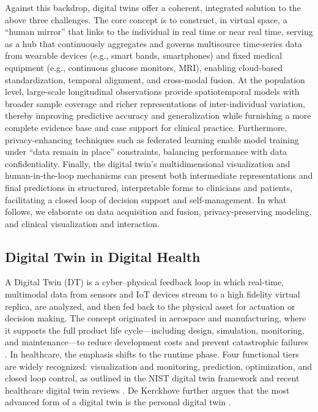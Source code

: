 \documentclass[acmsmall]{acmart}
\begin{document}
Against this backdrop, digital twins offer a coherent, integrated solution to the above three challenges. The core concept is to construct, in virtual space, a “human mirror” that links to the individual in real time or near real time, serving as a hub that continuously aggregates and governs multisource time-series data from wearable devices (e.g., smart bands, smartphones) and fixed medical equipment (e.g., continuous glucose monitors, MRI), enabling cloud-based standardization, temporal alignment, and cross-modal fusion. At the population level, large-scale longitudinal observations provide spatiotemporal models with broader sample coverage and richer representations of inter-individual variation, thereby improving predictive accuracy and generalization while furnishing a more complete evidence base and case support for clinical practice. Furthermore, privacy-enhancing techniques such as federated learning enable model training under “data remain in place” constraints, balancing performance with data confidentiality. Finally, the digital twin’s multidimensional visualization and human-in-the-loop mechanisms can present both intermediate representations and final predictions in structured, interpretable forms to clinicians and patients, facilitating a closed loop of decision support and self-management. In what follows, we elaborate on data acquisition and fusion, privacy-preserving modeling, and clinical visualization and interaction.

\subsection{Digital Twin in Digital Health}

A Digital Twin (DT) is a cyber–physical feedback loop in which real-time, multimodal data from sensors and IoT devices stream to a high fidelity virtual replica, are analyzed, and then fed back to the physical asset for actuation or decision making. The concept originated in aerospace and manufacturing, where it supports the full product life cycle—including design, simulation, monitoring, and maintenance—to reduce development costs and prevent catastrophic failures \cite{Tao2018}. In healthcare, the emphasis shifts to the runtime phase. Four functional tiers are widely recognized: visualization and monitoring, prediction, optimization, and closed loop control, as outlined in the NIST digital twin framework and recent healthcare digital twin reviews \cite{NIST2021,sun2023digitaltwin}. De Kerckhove further argues that the most advanced form of a digital twin is the personal digital twin \cite{deKerckhove2021}.
\end{document}
